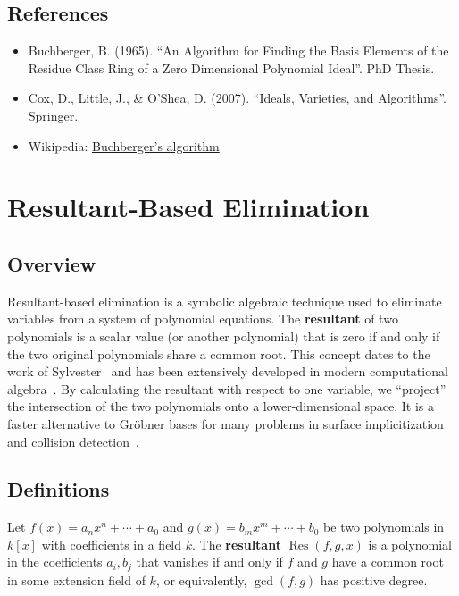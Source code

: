 \subsection{References}
\begin{itemize}
    \item Buchberger, B. (1965). ``An Algorithm for Finding the Basis Elements of the Residue Class Ring of a Zero Dimensional Polynomial Ideal''. PhD Thesis.
    \item Cox, D., Little, J., \& O'Shea, D. (2007). ``Ideals, Varieties, and Algorithms''. Springer.
    \item Wikipedia: \href{https://en.wikipedia.org/wiki/Buchberger\%27s_algorithm}{Buchberger's algorithm}
\end{itemize}

\section{Resultant-Based Elimination}
\label{sec:resultant_elimination}

\subsection{Overview}
Resultant-based elimination is a symbolic algebraic technique used to eliminate variables from a system of polynomial equations. The \textbf{resultant} of two polynomials is a scalar value (or another polynomial) that is zero if and only if the two original polynomials share a common root. This concept dates to the work of Sylvester~\cite{sylvester1840} and has been extensively developed in modern computational algebra~\cite{cox2007}. By calculating the resultant with respect to one variable, we ``project'' the intersection of the two polynomials onto a lower-dimensional space. It is a faster alternative to Gr\"obner bases for many problems in surface implicitization and collision detection~\cite{manocha1994}.

\subsection{Definitions}

\begin{definition}[Resultant]\label{def:resultant}
Let $f(x) = a_n x^n + \cdots + a_0$ and $g(x) = b_m x^m + \cdots + b_0$ be two polynomials in $k[x]$ with coefficients in a field $k$. The \textbf{resultant} $\operatorname{Res}(f, g, x)$ is a polynomial in the coefficients $a_i, b_j$ that vanishes if and only if $f$ and $g$ have a common root in some extension field of $k$, or equivalently, $\gcd(f, g)$ has positive degree.
\end{definition}


